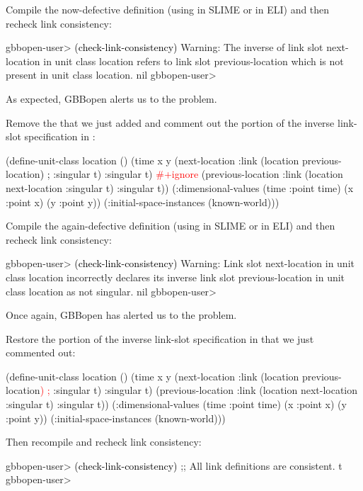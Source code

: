 \documentclass[10pt,twoside,english,pdftex]{article}
\begin{document}
Compile the now-defective definition (using  in SLIME or
 in ELI) and then recheck link consistency:
%
\W\supp
\begin{example}
\textcolor{darkergray}{%
  gbbopen-user> \textcolor{black}{(check-link-consistency)}
  Warning: The inverse of link slot next-location in unit class location 
           refers to link slot previous-location which is not present in 
           unit class location.
  nil
  gbbopen-user>}
\end{example}
%
As expected, GBBopen alerts us to the problem.

Remove the  that we just added and comment out the
 portion of the inverse link-slot specification in 
:
%
\W\supp
\begin{example}
\textcolor{darkergray}{%
  (define-unit-class location ()
    (time 
     x y
     (next-location
      :link (location previous-location\textcolor{black}{) ;} :singular t) 
      :singular t)
      \textcolor{red}{#+ignore}     
     (previous-location
      :link (location next-location :singular t)  
      :singular t))
    (:dimensional-values
      (time :point time)
      (x :point x)
      (y :point y))
    (:initial-space-instances (known-world)))}
\end{example}
%
Compile the again-defective definition (using  in SLIME or
 in ELI) and then recheck link consistency:
%
\W\supp\notpretop
\begin{example}
\textcolor{darkergray}{%
  gbbopen-user> \textcolor{black}{(check-link-consistency)}
  Warning: Link slot next-location in unit class location incorrectly 
           declares its inverse link slot previous-location in unit 
           class location as not singular.
  nil
  gbbopen-user>}
\end{example}
%
Once again, GBBopen has alerted us to the problem.

Restore the  portion of the inverse link-slot
specification in  that we just commented out:
%
\W\supp
\begin{example}
\textcolor{darkergray}{%
  (define-unit-class location ()
    (time 
     x y
     (next-location
      :link (location previous-location\textcolor{red}{) ;} :singular t) 
      :singular t)
     (previous-location
      :link (location next-location :singular t)  
      :singular t))
    (:dimensional-values
      (time :point time)
      (x :point x)
      (y :point y))
    (:initial-space-instances (known-world)))}
\end{example}
%
Then recompile and recheck link consistency:
%
\W\supp\notpretop
\begin{example}
\textcolor{darkergray}{%
  gbbopen-user> \textcolor{black}{(check-link-consistency)}
  ;; All link definitions are consistent.
  t
  gbbopen-user>}
\end{example}
\end{document}
